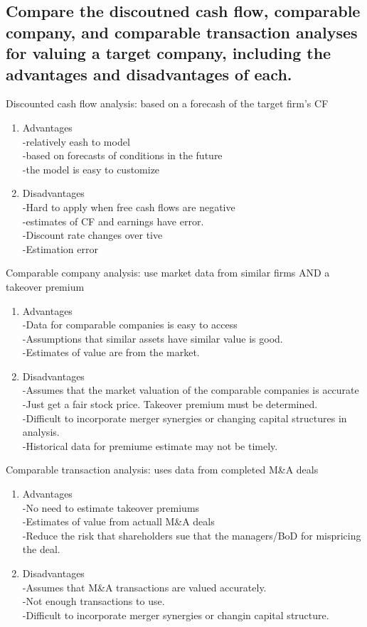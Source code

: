 \documentclass{article}
\newcommand{\be}{\begin{enumerate}}
\newcommand{\ee}{\end{enumerate}}
\begin{document}
\subsection{Compare the discoutned cash flow, comparable company, and comparable transaction analyses 
for valuing a target company, including the advantages and disadvantages of each.}
Discounted cash flow analysis: based on a forecash of the target firm's CF
\be
    \item Advantages
        \\-relatively eash to model
        \\-based on forecasts of conditions in the future
        \\-the model is easy to customize
    \item Disadvantages
        \\-Hard to apply when free cash flows are negative
        \\-estimates of CF and earnings have error.
        \\-Discount rate changes over tive
        \\-Estimation error
\ee
Comparable company analysis: use market data from similar firms AND a takeover 
premium
\be
    \item Advantages
        \\-Data for comparable companies is easy to access
        \\-Assumptions that similar assets have similar value is good.
        \\-Estimates of value are from the market.
    \item Disadvantages
        \\-Assumes that the market valuation of the comparable companies is accurate
        \\-Just get a fair stock price. Takeover premium must be determined.
        \\-Difficult to incorporate merger synergies or changing capital structures
        in analysis.
        \\-Historical data for premiume estimate may not be timely.
\ee
Comparable transaction analysis: uses data from completed M\&A deals
\be
    \item Advantages
        \\-No need to estimate takeover premiums
        \\-Estimates of value from actuall M\&A deals
        \\-Reduce the risk that shareholders sue that the managers/BoD for 
        mispricing the deal. 
    \item Disadvantages
        \\-Assumes that M\&A transactions are valued accurately.
        \\-Not enough transactions to use.
        \\-Difficult to incorporate merger synergies or changin capital structure.
\ee
\end{document}

